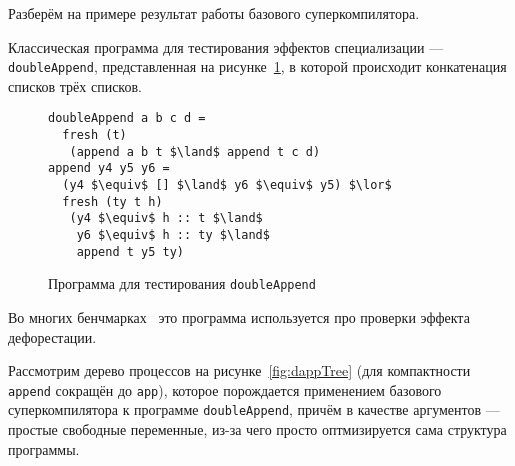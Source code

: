 

Разберём на примере результат работы базового суперкомпилятора.

Классическая программа для тестирования эффектов специализации ---
\lstinline{doubleAppend}, представленная на рисунке~\ref{fig:dappCode},
в которой происходит конкатенация списков трёх списков.

\begin{figure}[h!]
\begin{lstlisting}
doubleAppend a b c d =
  fresh (t)
   (append a b t $\land$ append t c d)
append y4 y5 y6 =
  (y4 $\equiv$ [] $\land$ y6 $\equiv$ y5) $\lor$
  fresh (ty t h)
   (y4 $\equiv$ h :: t $\land$
    y6 $\equiv$ h :: ty $\land$
    append t y5 ty)
\end{lstlisting}
\caption{Программа для тестирования \lstinline{doubleAppend}}
\label{fig:dappCode}
\end{figure}

Во многих бенчмарках~\cite{cpdPract, controlPoly} это программа используется
про проверки эффекта дефорестации.

Рассмотрим дерево процессов на рисунке~\ref{fig:dappTree}
(для компактности \lstinline{append} сокращён до \lstinline{app}),
которое порождается применением базового
суперкомпилятора к программе \lstinline{doubleAppend}, причём в
качестве аргументов --- простые свободные переменные, из-за чего
просто оптмизируется сама структура программы.

